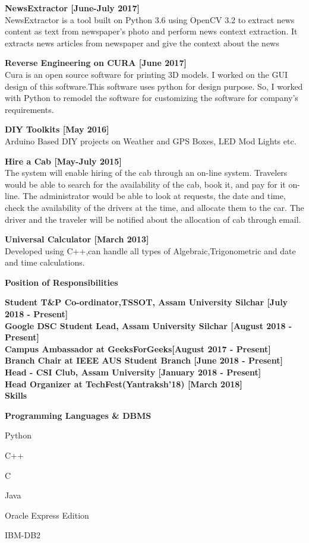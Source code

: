 \documentclass[a4paper,11pt,final]{memoir}
\newcommand{\SmallSep}{\vspace{0.5em}}
\newcommand{\CVSection}[1]
	{\Large\textbf{#1}\par
	\SmallSep\normalsize\normalfont}
\newcommand{\CVItem}[1]
	{\textbf{\color{RoyalBlue} #1}}
\begin{document}
\CVItem{ NewsExtractor [June-July 2017]}\\
NewsExtractor  is a tool built on Python 3.6 using OpenCV 3.2 to extract news content as text from newspaper’s photo and perform news context extraction. It extracts news articles from newspaper and give the context about the news
\SmallSep


\CVItem{Reverse Engineering on CURA [June 2017]}\\
 Cura is an open source software for printing 3D models. I worked on the GUI design of this software.This software uses python for design purpose. So, I worked with Python to remodel the software for customizing the software for company's requirements. 
\SmallSep

\CVItem{DIY Toolkits [May 2016]}\\
  Arduino Based DIY projects on Weather and GPS Boxes, LED Mod Lights etc.
\SmallSep

\CVItem{Hire a Cab [May-July 2015]}\\
 The system will enable hiring of the cab through an on-line system. Travelers would be able to search for the availability of the cab, book it, and pay for it on-line. The administrator would be able to look at requests, the date and time, check the availability of the drivers at the time, and allocate them to the car. The driver and the traveler will be notified about the allocation of cab through email.
\SmallSep


\CVItem{Universal Calculator  [March 2013]}\\
 Developed using C++,can handle all types of Algebraic,Trigonometric and date and time calculations.
\SmallSep

\CVSection{Position of Responsibilities}
\CVItem{Student T\&P Co-ordinator,TSSOT, Assam University Silchar [July 2018 - Present]}
\SmallSep \\
\CVItem{Google DSC Student Lead, Assam University Silchar [August 2018 - Present]}
\SmallSep\\
\CVItem{Campus Ambassador at GeeksForGeeks[August 2017 - Present]}
\SmallSep \\
\CVItem{Branch Chair at IEEE AUS Student Branch [June 2018 - Present]}
\SmallSep \\
\CVItem{Head - CSI Club, Assam University [January 2018 - Present]}
\SmallSep \\
\CVItem{Head Organizer at TechFest(Yantraksh'18) [March 2018]}
\SmallSep \\


\CVSection{Skills}
\CVItem{Programming Languages \& DBMS}
\begin{multicols}{3}
\begin{compactitem}[\color{RoyalBlue}$\circ$]
	\item Python
	\item C++
	\item C
	\item Java
	\item Oracle Express Edition
	\item IBM-DB2
\end{compactitem}
\end{multicols}
\SmallSep
\end{document}
